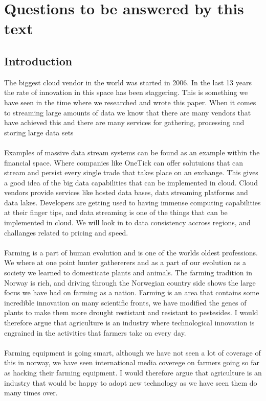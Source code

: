 \documentclass[]{uiophd}
\begin{document}
\section{Questions to be answered by this text}

\subsection{Introduction }
The biggest cloud vendor in the world was started in 2006. In the last 13 years the rate of innovation in this space has been staggering. This is something we have seen in the time where we researched and wrote this paper. When it comes to streaming large amounts of data we know that there are many vendors that have achieved this and there are many services for gathering, processing and storing large data sets
\\\\
Examples of massive data stream systems can be found as an example within the financial space. Where companies like OneTick can offer solutuions that can stream and persist every single trade that takes place on an exchange. This gives a good idea of the big data capabilities that can be implemented in cloud. Cloud vendors provide services like hosted data bases, data streaming platforms and data lakes. Developers are getting used to having immense computing capabilities at their finger tips, and data streaming is one of the things that can be implemented in cloud. We will look in to data consistency accross regions, and challanges related to pricing and speed.
\\\\
Farming is a part of human evolution and is one of the worlds oldest professions. We where at one point hunter gathererers and as a part of our evolution as a society we learned to domesticate plants and animals. The farming tradition in Norway is rich, and driving through the Norwegian country side shows the large focus we have had on farming as a nation. Farming is an area that contains some incredible innovation on many scientific fronts, we have modified the genes of plants to make them more drought restistant and resistant to pestesides. I would therefore argue that agriculture is an industry where technological innovation is engrained in the activities that farmers take on every day.
\\\\
Farming equipment is going smart, although we have not seen a lot of coverage of this in norway, we have seen international media coverege on farmers going so far as hacking their farming equipment. I would therefore argue that agriculture is an industry that would be happy to adopt new technology as we have seen them do many times over.
\end{document}
